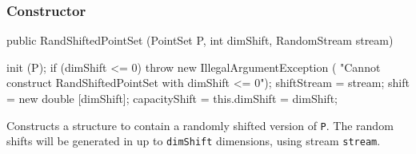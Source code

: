 \subsubsection*{Constructor}

\begin{code}

   public RandShiftedPointSet (PointSet P, int dimShift, RandomStream stream)\begin{hide} {
      init (P);
      if (dimShift <= 0) {
         throw new IllegalArgumentException (
            "Cannot construct RandShiftedPointSet with dimShift <= 0");
      }
      shiftStream = stream;
      shift = new double [dimShift];
      capacityShift = this.dimShift = dimShift;
   }\end{hide}
\end{code}
 \begin{tabb}
  Constructs a structure to contain a randomly shifted version of \texttt{P}.
  The random shifts will be generated in up to \texttt{dimShift} dimensions,
  using stream \texttt{stream}.
 \end{tabb}
\begin{htmlonly}
\end{htmlonly}

